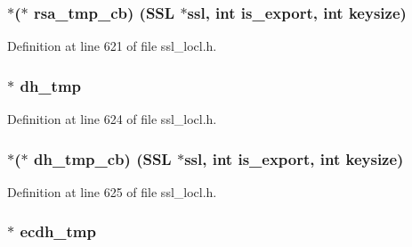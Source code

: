 \subsubsection[{\texorpdfstring{rsa\+\_\+tmp\+\_\+cb}{rsa_tmp_cb}}]{$\ast$($\ast$ rsa\+\_\+tmp\+\_\+cb) ({\bf S\+SL} $\ast$ssl, int is\+\_\+export, int keysize)}\hypertarget{structcert__st_a1d3a53161b19cb88960dcc158bc5efe5}{}\label{structcert__st_a1d3a53161b19cb88960dcc158bc5efe5}


Definition at line 621 of file ssl\+\_\+locl.\+h.

\subsubsection[{\texorpdfstring{dh\+\_\+tmp}{dh_tmp}}]{$\ast$ dh\+\_\+tmp}\hypertarget{structcert__st_afdfb4bed7c2a22d4ca12652a4b38a718}{}\label{structcert__st_afdfb4bed7c2a22d4ca12652a4b38a718}


Definition at line 624 of file ssl\+\_\+locl.\+h.

\subsubsection[{\texorpdfstring{dh\+\_\+tmp\+\_\+cb}{dh_tmp_cb}}]{$\ast$($\ast$ dh\+\_\+tmp\+\_\+cb) ({\bf S\+SL} $\ast$ssl, int is\+\_\+export, int keysize)}\hypertarget{structcert__st_a073f62de068badf5d62813f41001b4f3}{}\label{structcert__st_a073f62de068badf5d62813f41001b4f3}


Definition at line 625 of file ssl\+\_\+locl.\+h.

\subsubsection[{\texorpdfstring{ecdh\+\_\+tmp}{ecdh_tmp}}]{$\ast$ ecdh\+\_\+tmp}\hypertarget{structcert__st_a3b9464ad2cb5fec0673874f9e6502e10}{}\label{structcert__st_a3b9464ad2cb5fec0673874f9e6502e10}



